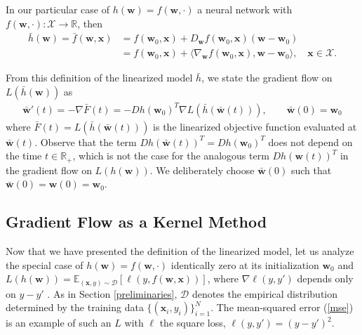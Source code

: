 \documentclass{article}
\begin{document}
In our particular case of $h(\boldsymbol{w}) = f(\boldsymbol{w}, \cdot)$ a neural network with $f(\boldsymbol{w}, \cdot): \mathcal{X} \rightarrow \mathbb{R}$, then
\begin{align}
    \bar{h}(\boldsymbol{w}) = \bar{f}(\boldsymbol{w}, \boldsymbol{x}) &= f(\boldsymbol{w}_0, \boldsymbol{x}) + D_{\boldsymbol{w}}f(\boldsymbol{w}_0, \boldsymbol{x})(\boldsymbol{w}-\boldsymbol{w}_0) \nonumber\\ 
    &= f(\boldsymbol{w}_0, \boldsymbol{x}) + \langle \nabla_{\boldsymbol{w}} f(\boldsymbol{w}_0, \boldsymbol{x}), \boldsymbol{w}-\boldsymbol{w}_0\rangle, \quad \boldsymbol{x} \in \mathcal{X}.\label{linearizedmodelnetwork}
\end{align}

From this definition of the linearized model $\bar{h}$, we state the gradient flow on $L(\bar{h}(\boldsymbol{w}))$ as 
\begin{align*}
    \boldsymbol{\bar{w}}'(t) = -\nabla \bar{F}(t) = - Dh(\boldsymbol{w}_0)^T \nabla L(\bar{h}(\boldsymbol{\bar{w}}(t))), \qquad \boldsymbol{\bar{w}}(0) = \boldsymbol{w}_0
\end{align*}
where $\bar{F}(t) = L(\bar{h}(\boldsymbol{\bar{w}}(t)))$ is the linearized objective function evaluated at $\boldsymbol{\bar{w}}(t)$. Observe that the term $Dh(\boldsymbol{\bar{w}}(t))^T = Dh(\boldsymbol{w}_0)^T$ does not depend on the time $t \in \mathbb{R}_+$, which is not the case for the analogous term $Dh(\boldsymbol{w}(t))^T$ in the gradient flow on $L(h(\boldsymbol{w}))$. We deliberately choose $\boldsymbol{\bar{w}}(0)$ such that $\boldsymbol{\bar{w}}(0) = \boldsymbol{w}(0) = \boldsymbol{w}_0$.

\subsection{Gradient Flow as a Kernel Method}\label{kernelmethod}

Now that we have presented the definition of the linearized model, let us analyze the special case of $h(\boldsymbol{w}) = f(\boldsymbol{w}, \cdot)$ identically zero at its initialization $\boldsymbol{w}_0$ and $L(h(\boldsymbol{w})) = \mathbb{E}_{(\boldsymbol{x}, y) \sim \mathcal{D}} [\ell(y, f(\boldsymbol{w}, \boldsymbol{x}))]$, where $\nabla \ell(y, y')$ depends only on $y - y'$ \cite{chizat2018note}. As in Section \ref{preliminaries}, $\mathcal{D}$ denotes the empirical distribution determined by the training data $\{ (\boldsymbol{x}_i, y_i) \}_{i=1}^N$. The mean-squared error (\ref{mse}) is an example of such an $L$ with $\ell$ the square loss, $\ell(y, y') = (y - y')^2$. 
\end{document}
